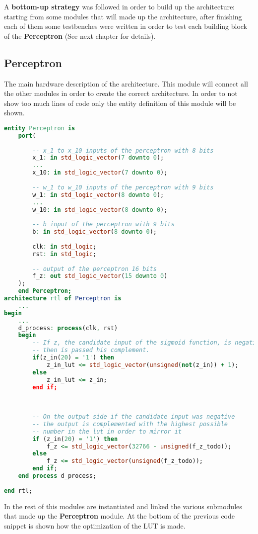 A \textbf{bottom-up strategy} was followed in order to build up the architecture: starting from some modules that will made up the architecture, after finishing each of them some testbenches were written in order to test each building block of the \textbf{Perceptron} (See next chapter for details).
\subsection{Perceptron}
The main hardware description of the architecture. This module will connect all the other modules in order to create the correct architecture. In order to not show too much lines of code only the entity definition of this module will be shown.
\begin{lstlisting}[language=VHDL]
	entity Perceptron is
	port(
	
		-- x_1 to x_10 inputs of the perceptron with 8 bits
		x_1: in std_logic_vector(7 downto 0);
		...
		x_10: in std_logic_vector(7 downto 0);
		
		-- w_1 to w_10 inputs of the perceptron with 9 bits
		w_1: in std_logic_vector(8 downto 0);
		...
		w_10: in std_logic_vector(8 downto 0);
		
		-- b input of the perceptron with 9 bits
		b: in std_logic_vector(8 downto 0);
		
		clk: in std_logic;
		rst: in std_logic;
		
		-- output of the perceptron 16 bits
		f_z: out std_logic_vector(15 downto 0)
	);
	end Perceptron;
architecture rtl of Perceptron is
	...
begin
	...
	d_process: process(clk, rst)
	begin
		-- If z, the candidate input of the sigmoid function, is negative,
		-- then is passed his complement.
		if(z_in(20) = '1') then
			z_in_lut <= std_logic_vector(unsigned(not(z_in)) + 1);
		else
			z_in_lut <= z_in;
		end if;
		
		
		
		-- On the output side if the candidate input was negative
		-- the output is complemented with the highest possible
		-- number in the lut in order to mirror it
		if (z_in(20) = '1') then 
			f_z <= std_logic_vector(32766 - unsigned(f_z_todo));
		else
			f_z <= std_logic_vector(unsigned(f_z_todo));
		end if;
	end process d_process;
	
end rtl; 
\end{lstlisting}

In the rest of this modules are instantiated and linked the various submodules that made up the \textbf{Perceptron} module. At the bottom of the previous code snippet is shown how the optimization of the LUT is made. 


